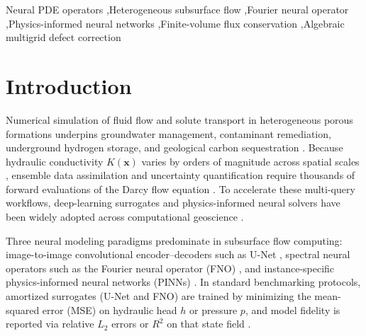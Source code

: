 \documentclass[preprint,12pt,authoryear]{elsarticle}
\begin{document}
\begin{frontmatter}
\begin{keyword}
Neural PDE operators \sep Heterogeneous subsurface flow \sep Fourier neural operator \sep Physics-informed neural networks \sep Finite-volume flux conservation \sep Algebraic multigrid defect correction
\end{keyword}

\end{frontmatter}

\section{Introduction}
\label{sec:intro}

Numerical simulation of fluid flow and solute transport in heterogeneous porous formations underpins groundwater management, contaminant remediation, underground hydrogen storage, and geological carbon sequestration \citep{bear1972dynamics,dagan1989flow,gelhar1993stochastic,blunt2017multiphase,lie2019mrst}. Because hydraulic conductivity $K(\mathbf{x})$ varies by orders of magnitude across spatial scales \citep{delhomme1979spatial,rubin2003applied,efendiev2013gmsfem}, ensemble data assimilation and uncertainty quantification require thousands of forward evaluations of the Darcy flow equation \citep{carrera2005inverse,laloy2012dream,chen2013ensemble,emerick2013esmda,kitanidis2014pcga}. To accelerate these multi-query workflows, deep-learning surrogates and physics-informed neural solvers have been widely adopted across computational geoscience \citep{tripathy2018deepuq,zhu2018bayesian,raissi2019pinn,mo2019deep,chang2020dl,karumuri2020simfree,tang2020dl,li2021fno,lu2021deeponet,karniadakis2021piml,lauzon2024unet}.

Three neural modeling paradigms predominate in subsurface flow computing: image-to-image convolutional encoder--decoders such as U-Net \citep{ronneberger2015unet,zhu2018bayesian,mo2019deep,chang2020dl,wang2020tgnn,lauzon2024unet}, spectral neural operators such as the Fourier neural operator (FNO) \citep{li2021fno,wen2022ufno,kovachki2023no,awr2025fvfno,awr2026benchmark}, and instance-specific physics-informed neural networks (PINNs) \citep{sirignano2018dgm,weinan2018drm,raissi2019pinn,tartakovsky2020physics,bandai2021wrr,kashefi2023pnet,cuomo2022scientific,awr2024pinn}. In standard benchmarking protocols, amortized surrogates (U-Net and FNO) are trained by minimizing the mean-squared error (MSE) on hydraulic head $h$ or pressure $p$, and model fidelity is reported via relative $L_2$ errors or $R^2$ on that state field \citep{zhu2018bayesian,mo2019deep,lu2022comprehensive}.
\end{document}
